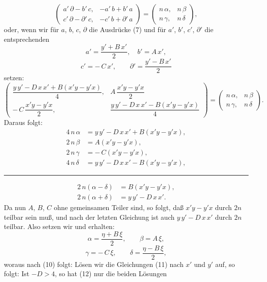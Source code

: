 \[
\begin{pmatrix} a'\,\partial - b'\,c, & -a'\,b + b'\,a\\ c'\,\partial - \partial'\,c, & -c'\,b + \partial'\,a \end{pmatrix} = \begin{pmatrix} n\,\alpha, & n\,\beta\\ n\,\gamma, & n\,\delta \end{pmatrix},
\]
oder, wenn wir für $a$, $b$, $c$, $\partial$ die Ausdrücke (7) und für
$a'$, $b'$, $c'$, $\partial'$ die entsprechenden
\[
a' = \frac{y'+B\,x'}{2}, \quad b' = A\,x',
\]
\[
c' = -\,C\,x', \qquad \partial' = \frac{y'-B\,x'}{2}
\]
setzen:
\[
\begin{pmatrix} \dfrac{y\,y'-D\,x\,x'+B(x'y-y'x)}{4}, & A\,\dfrac{x'y-y'x}{2}\\[2ex] -\,C\,\dfrac{x'y-y'x}{2}, & \dfrac{y\,y'-D\,x\,x'-B(x'y-y'x)}{4} \end{pmatrix} = \begin{pmatrix} n\,\alpha, & n\,\beta\\ n\,\gamma, & n\,\delta \end{pmatrix}.
\]
Daraus folgt:
\[
\begin{aligned}
4\,n\,\alpha &= y\,y' - D\,x\,x' + B(x'y-y'x),\\
2\,n\,\beta &= A(x'y-y'x),\\
2\,n\,\gamma &= -\,C(x'y-y'x),\\
4\,n\,\delta &= y\,y' - D\,x\,x' - B(x'y-y'x),
\end{aligned}
\]
\begin{center}\rule{0.32\linewidth}{0.4pt}\end{center}
\[
\begin{aligned}
2\,n(\alpha-\delta) &= B(x'y-y'x),\\
2\,n(\alpha+\delta) &= y\,y' - D\,x\,x'.
\end{aligned}
\]
Da nun $A$, $B$, $C$ ohne gemeinsamen Teiler sind, so folgt, daß $x'y -
y'x$ durch $2n$ teilbar sein muß, und nach der letzten Gleichung ist
auch $y\,y' - D\,x\,x'$ durch $2n$ teilbar. Also setzen wir
und erhalten:
\[
\alpha = \frac{\eta+B\,\xi}{2}, \qquad \beta = A\,\xi,
\]
\[
\gamma = -\,C\,\xi, \qquad \delta = \frac{\eta-B\,\xi}{2},
\]
woraus nach (10) folgt:
Lösen wir die Gleichungen (11) nach $x'$ und $y'$ auf, so folgt:
Ist $-D > 4$, so hat (12) nur die beiden Lösungen

